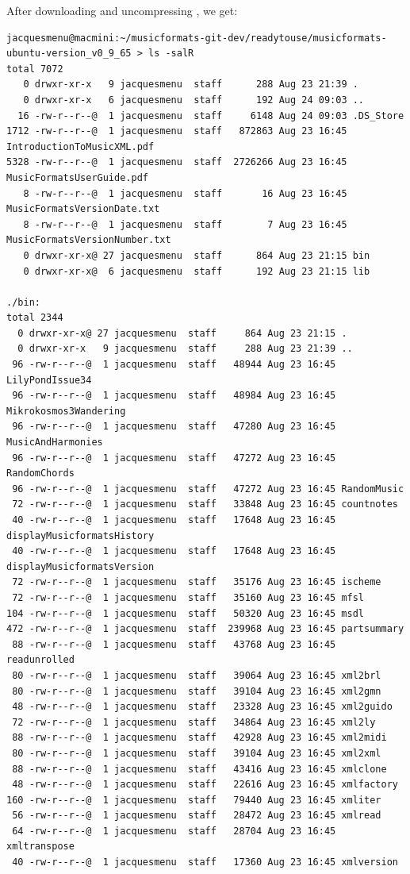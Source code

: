 After downloading and uncompressing , we get:
\begin{lstlisting}[language=Terminal]
jacquesmenu@macmini:~/musicformats-git-dev/readytouse/musicformats-ubuntu-version_v0_9_65 > ls -salR
total 7072
   0 drwxr-xr-x   9 jacquesmenu  staff      288 Aug 23 21:39 .
   0 drwxr-xr-x   6 jacquesmenu  staff      192 Aug 24 09:03 ..
  16 -rw-r--r--@  1 jacquesmenu  staff     6148 Aug 24 09:03 .DS_Store
1712 -rw-r--r--@  1 jacquesmenu  staff   872863 Aug 23 16:45 IntroductionToMusicXML.pdf
5328 -rw-r--r--@  1 jacquesmenu  staff  2726266 Aug 23 16:45 MusicFormatsUserGuide.pdf
   8 -rw-r--r--@  1 jacquesmenu  staff       16 Aug 23 16:45 MusicFormatsVersionDate.txt
   8 -rw-r--r--@  1 jacquesmenu  staff        7 Aug 23 16:45 MusicFormatsVersionNumber.txt
   0 drwxr-xr-x@ 27 jacquesmenu  staff      864 Aug 23 21:15 bin
   0 drwxr-xr-x@  6 jacquesmenu  staff      192 Aug 23 21:15 lib

./bin:
total 2344
  0 drwxr-xr-x@ 27 jacquesmenu  staff     864 Aug 23 21:15 .
  0 drwxr-xr-x   9 jacquesmenu  staff     288 Aug 23 21:39 ..
 96 -rw-r--r--@  1 jacquesmenu  staff   48944 Aug 23 16:45 LilyPondIssue34
 96 -rw-r--r--@  1 jacquesmenu  staff   48984 Aug 23 16:45 Mikrokosmos3Wandering
 96 -rw-r--r--@  1 jacquesmenu  staff   47280 Aug 23 16:45 MusicAndHarmonies
 96 -rw-r--r--@  1 jacquesmenu  staff   47272 Aug 23 16:45 RandomChords
 96 -rw-r--r--@  1 jacquesmenu  staff   47272 Aug 23 16:45 RandomMusic
 72 -rw-r--r--@  1 jacquesmenu  staff   33848 Aug 23 16:45 countnotes
 40 -rw-r--r--@  1 jacquesmenu  staff   17648 Aug 23 16:45 displayMusicformatsHistory
 40 -rw-r--r--@  1 jacquesmenu  staff   17648 Aug 23 16:45 displayMusicformatsVersion
 72 -rw-r--r--@  1 jacquesmenu  staff   35176 Aug 23 16:45 ischeme
 72 -rw-r--r--@  1 jacquesmenu  staff   35160 Aug 23 16:45 mfsl
104 -rw-r--r--@  1 jacquesmenu  staff   50320 Aug 23 16:45 msdl
472 -rw-r--r--@  1 jacquesmenu  staff  239968 Aug 23 16:45 partsummary
 88 -rw-r--r--@  1 jacquesmenu  staff   43768 Aug 23 16:45 readunrolled
 80 -rw-r--r--@  1 jacquesmenu  staff   39064 Aug 23 16:45 xml2brl
 80 -rw-r--r--@  1 jacquesmenu  staff   39104 Aug 23 16:45 xml2gmn
 48 -rw-r--r--@  1 jacquesmenu  staff   23328 Aug 23 16:45 xml2guido
 72 -rw-r--r--@  1 jacquesmenu  staff   34864 Aug 23 16:45 xml2ly
 88 -rw-r--r--@  1 jacquesmenu  staff   42928 Aug 23 16:45 xml2midi
 80 -rw-r--r--@  1 jacquesmenu  staff   39104 Aug 23 16:45 xml2xml
 88 -rw-r--r--@  1 jacquesmenu  staff   43416 Aug 23 16:45 xmlclone
 48 -rw-r--r--@  1 jacquesmenu  staff   22616 Aug 23 16:45 xmlfactory
160 -rw-r--r--@  1 jacquesmenu  staff   79440 Aug 23 16:45 xmliter
 56 -rw-r--r--@  1 jacquesmenu  staff   28472 Aug 23 16:45 xmlread
 64 -rw-r--r--@  1 jacquesmenu  staff   28704 Aug 23 16:45 xmltranspose
 40 -rw-r--r--@  1 jacquesmenu  staff   17360 Aug 23 16:45 xmlversion


\end{lstlisting}
